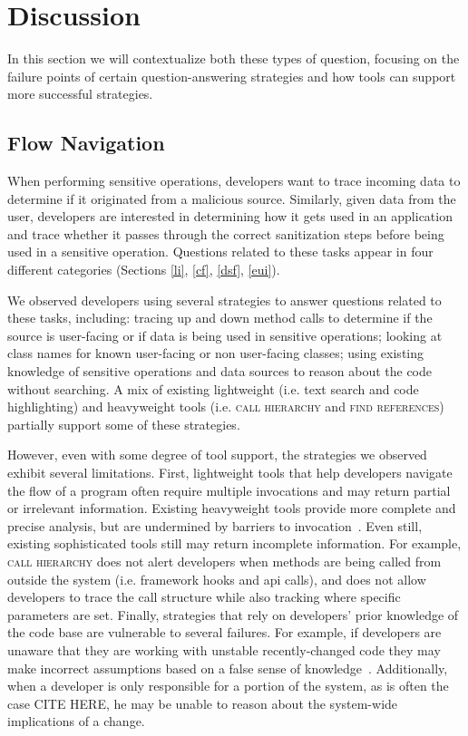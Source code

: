 \documentclass{acm_proc_article-sp}
\begin{document}
\section{Discussion}
In this section we will contextualize both these types of question, focusing on the failure points of certain question-answering strategies and how tools can support more successful strategies.

\subsection{Flow Navigation}
When performing sensitive operations, developers want to trace incoming data to determine if it originated from a malicious source. 
Similarly, given data from the user, developers are interested in determining how it gets used in an application and trace whether it passes through the correct sanitization steps before being used in a sensitive operation. Questions related to these tasks appear in four different categories (Sections \ref{li}, \ref{cf}, \ref{dsf}, \ref{eui}).

We observed developers using several strategies to answer questions related to these tasks, including: tracing up and down method calls to determine if the source is user-facing or if data is being used in sensitive operations; looking at class names for known user-facing or non user-facing classes; using existing knowledge of sensitive operations and data sources to reason about the code without searching. A mix of existing lightweight (i.e. text search and code highlighting) and heavyweight tools (i.e. \textsc{call hierarchy} and \textsc{find references}) partially support some of these strategies. 

However, even with some degree of tool support, the strategies we observed exhibit several limitations. 
First, lightweight tools that help developers navigate the flow of a program often require multiple invocations and may return partial or irrelevant information. 
Existing heavyweight tools provide more complete and precise analysis, but are undermined by barriers to invocation~\cite{johnson2013don}. 
Even still, existing sophisticated tools still may return incomplete information. 
For example, \textsc{call hierarchy} does not alert developers when methods are being called from outside the system (i.e. framework hooks and api calls), and does not allow developers to trace the call structure while also tracking where specific parameters are set.
Finally, strategies that rely on developers' prior knowledge of the code base are vulnerable to several failures. 
For example, if developers are unaware that they are working with unstable recently-changed code they may make incorrect assumptions based on a false sense of knowledge~\cite{fritz2014degree}. 
Additionally, when a developer is only responsible for a portion of the system, as is often the case CITE HERE, he may be unable to reason about the system-wide implications of a change. 
\end{document}
